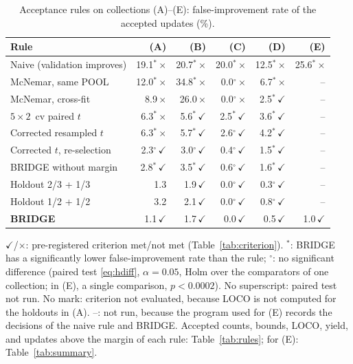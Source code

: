 \begin{table}[!t]
\centering
\footnotesize
\setlength{\tabcolsep}{3pt}
\caption{Acceptance rules on collections (A)--(E): false-improvement rate of the accepted updates (\%).}
\label{tab:rulesall}
\begin{tabular}{@{}lrrrrr@{}}
\toprule
Rule & (A) & (B) & (C) & (D) & (E) \\
\midrule
Naive (validation improves)  & 19.1$^{*}$\,$\times$ & 20.7$^{*}$\,$\times$ & 20.0$^{*}$\,$\times$ & 12.5$^{*}$\,$\times$ & 25.6$^{*}$\,$\times$ \\
McNemar, same POOL  & 12.0$^{*}$\,$\times$ & 34.8$^{*}$\,$\times$ & 0.0$^{\circ}$\,$\times$ & 6.7$^{*}$\,$\times$ & -- \\
McNemar, cross-fit  & 8.9\,$\times$ & 26.0\,$\times$ & 0.0$^{\circ}$\,$\times$ & 2.5$^{*}$\,$\checkmark$ & -- \\
$5\times2$~cv paired $t$  & 6.3$^{*}$\,$\times$ & 5.6$^{*}$\,$\checkmark$ & 2.5$^{*}$\,$\checkmark$ & 3.6$^{*}$\,$\checkmark$ & -- \\
Corrected resampled $t$  & 6.3$^{*}$\,$\times$ & 5.7$^{*}$\,$\checkmark$ & 2.6$^{\circ}$\,$\checkmark$ & 4.2$^{*}$\,$\checkmark$ & -- \\
Corrected $t$, re-selection  & 2.3$^{\circ}$\,$\checkmark$ & 3.0$^{\circ}$\,$\checkmark$ & 0.4$^{\circ}$\,$\checkmark$ & 1.5$^{*}$\,$\checkmark$ & -- \\
BRIDGE without margin  & 2.8$^{*}$\,$\checkmark$ & 3.5$^{*}$\,$\checkmark$ & 0.6$^{\circ}$\,$\checkmark$ & 1.6$^{*}$\,$\checkmark$ & -- \\
Holdout 2/3 + 1/3  & 1.3 & 1.9\,$\checkmark$ & 0.0$^{\circ}$\,$\checkmark$ & 0.3$^{\circ}$\,$\checkmark$ & -- \\
Holdout 1/2 + 1/2  & 3.2 & 2.1\,$\checkmark$ & 0.0$^{\circ}$\,$\checkmark$ & 0.8$^{\circ}$\,$\checkmark$ & -- \\
\textbf{BRIDGE} & 1.1\,$\checkmark$ & 1.7\,$\checkmark$ & 0.0\,$\checkmark$ & 0.5\,$\checkmark$ & 1.0\,$\checkmark$ \\
\bottomrule
\end{tabular}

\vspace{2pt}
\parbox{\linewidth}{\justifying\scriptsize $\checkmark$/$\times$: pre-registered criterion met/not met (Table~\ref{tab:criterion}). $^{*}$: BRIDGE has a significantly lower false-improvement rate than the rule; $^{\circ}$: no significant difference (paired test \eqref{eq:hdiff}, $\alpha=0.05$, Holm over the comparators of one collection; in (E), a single comparison, $p<0.0002$). No superscript: paired test not run. No mark: criterion not evaluated, because LOCO is not computed for the holdouts in (A). --: not run, because the program used for (E) records the decisions of the naive rule and BRIDGE. Accepted counts, bounds, LOCO, yield, and updates above the margin of each rule: Table~\ref{tab:rules}; for (E): Table~\ref{tab:summary}.}
\end{table}

